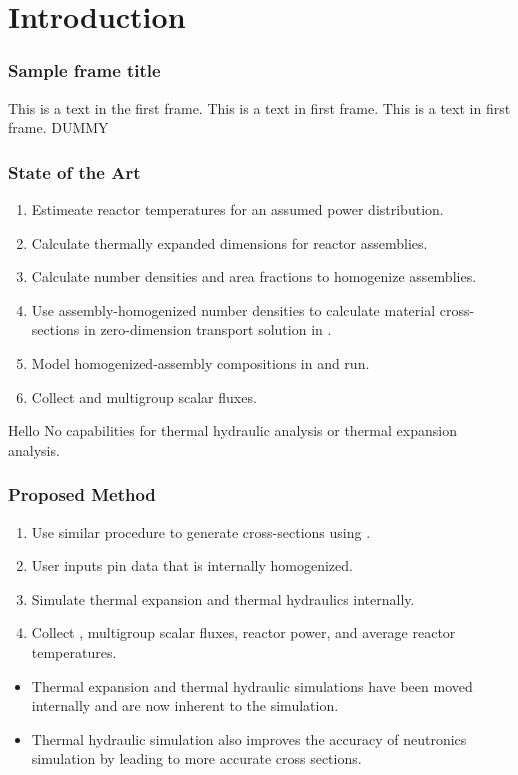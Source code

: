 \section{Introduction}
\label{sec:introduction}

\begin{frame}
  \frametitle{Sample frame title}
  This is a text in the first frame. This is a text in first frame. This is a
  text in first frame. DUMMY
\end{frame}

\begin{frame}
  \frametitle{State of the Art}

  \begin{enumerate}
    \item Estimeate reactor temperatures for an assumed power distribution.
    \item Calculate thermally expanded dimensions for reactor assemblies.
    \item Calculate number densities and area fractions to homogenize
      assemblies.
    \item Use assembly-homogenized number densities to calculate material
      cross-sections in zero-dimension transport solution in \mcc.
    \item Model homogenized-assembly compositions in \dif and run.
    \item Collect \keff and multigroup scalar fluxes.
  \end{enumerate}

  \begin{block}{Hello}
    No capabilities for thermal hydraulic analysis or thermal expansion
    analysis.
  \end{block}
\end{frame}

\begin{frame}
  \frametitle{Proposed Method}
  \begin{enumerate}
    \item Use similar procedure to generate cross-sections using \mcc.
    \item User inputs pin data that is internally homogenized.
    \item Simulate thermal expansion and thermal hydraulics internally.
    \item Collect \keff, multigroup scalar fluxes, reactor power, and average
      reactor temperatures.
  \end{enumerate}
  \begin{itemize}
    \item Thermal expansion and thermal hydraulic simulations have been moved
      internally and are now inherent to the simulation.
    \item Thermal hydraulic simulation also improves the accuracy of neutronics
      simulation by leading to more accurate cross sections.
  \end{itemize}
\end{frame}
